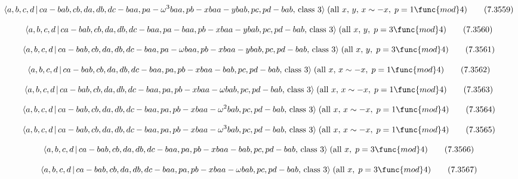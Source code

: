 \documentclass[10pt]{article}
\begin{document}
\begin{equation}
\langle a,b,c,d\,|\,ca-bab,cb,da,db,dc-baa,pa-\omega
^{3}baa,pb-xbaa-ybab,pc,pd-bab,\,\text{class }3\rangle \;(\text{all }%
x,\,y,\,x\sim -x,\;p=1\func{mod}4)  \tag{7.3559}
\end{equation}

\begin{equation}
\langle a,b,c,d\,|\,ca-bab,cb,da,db,dc-baa,pa-baa,pb-xbaa-ybab,pc,pd-bab,\,%
\text{class }3\rangle \;(\text{all }x,\,y,\;p=3\func{mod}4)  \tag{7.3560}
\end{equation}

\begin{equation}
\langle a,b,c,d\,|\,ca-bab,cb,da,db,dc-baa,pa-\omega
baa,pb-xbaa-ybab,pc,pd-bab,\,\text{class }3\rangle \;(\text{all }x,\,y,\;p=3%
\func{mod}4)  \tag{7.3561}
\end{equation}

\begin{equation}
\langle a,b,c,d\,|\,ca-bab,cb,da,db,dc-baa,pa,pb-xbaa-bab,pc,pd-bab,\,\text{%
class }3\rangle \;(\text{all }x,\,x\sim -x,\;p=1\func{mod}4)  \tag{7.3562}
\end{equation}

\begin{equation}
\langle a,b,c,d\,|\,ca-bab,cb,da,db,dc-baa,pa,pb-xbaa-\omega bab,pc,pd-bab,\,%
\text{class }3\rangle \;(\text{all }x,\,x\sim -x,\;p=1\func{mod}4) 
\tag{7.3563}
\end{equation}

\begin{equation}
\langle a,b,c,d\,|\,ca-bab,cb,da,db,dc-baa,pa,pb-xbaa-\omega
^{2}bab,pc,pd-bab,\,\text{class }3\rangle \;(\text{all }x,\,x\sim -x,\;p=1%
\func{mod}4)  \tag{7.3564}
\end{equation}

\begin{equation}
\langle a,b,c,d\,|\,ca-bab,cb,da,db,dc-baa,pa,pb-xbaa-\omega
^{3}bab,pc,pd-bab,\,\text{class }3\rangle \;(\text{all }x,\,x\sim -x,\;p=1%
\func{mod}4)  \tag{7.3565}
\end{equation}

\begin{equation}
\langle a,b,c,d\,|\,ca-bab,cb,da,db,dc-baa,pa,pb-xbaa-bab,pc,pd-bab,\,\text{%
class }3\rangle \;(\text{all }x,\;p=3\func{mod}4)  \tag{7.3566}
\end{equation}

\begin{equation}
\langle a,b,c,d\,|\,ca-bab,cb,da,db,dc-baa,pa,pb-xbaa-\omega bab,pc,pd-bab,\,%
\text{class }3\rangle \;(\text{all }x,\;p=3\func{mod}4)  \tag{7.3567}
\end{equation}
\end{document}
